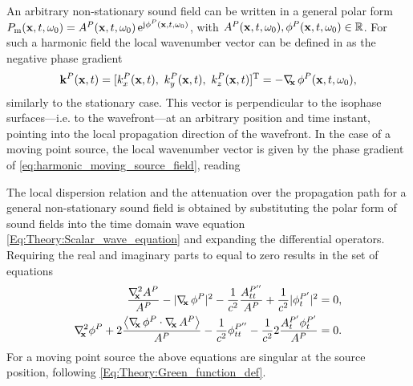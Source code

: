 An arbitrary non-stationary sound field can be written in a general polar form $P_{\mathrm{m}}(\mathbf{x},t,\omega_0) = A^P(\mathbf{x},t,\omega_0) \, \mathrm{e}^{\mathrm{j} \phi^P(\mathbf{x},t,\omega_0)}$, with $A^P(\mathbf{x},t,\omega_0),\phi^P(\mathbf{x},t,\omega_0) \in \mathbb{R}$.
For such a harmonic field the local wavenumber vector can be defined in as the negative phase gradient
\begin{equation}
\label{eq:HF_appr:general_loc_wn}
\mathbf{k}^P(\mathbf{x},t) = [k_x^P(\mathbf{x},t),\ k_y^P(\mathbf{x},t),\ k_z^P(\mathbf{x},t)]^{\mathrm{T}} = -\nabla_{\!\!\mathbf{x}}\, \phi^P(\mathbf{x},t,\omega_0),
\end{equation}
similarly to the stationary case.
This vector is perpendicular to the isophase surfaces---i.e. to the wavefront---at an arbitrary position and time instant, pointing into the local propagation direction of the wavefront.
In the case of a moving point source, the local wavenumber vector is given by the phase gradient of \eqref{eq:harmonic_moving_source_field}, reading

The local dispersion relation and the attenuation over the propagation path for a general non-stationary sound field is obtained by substituting the polar form of sound fields into the time domain wave equation \eqref{Eq:Theory:Scalar_wave_equation} and expanding the differential operators.
Requiring the real and imaginary parts to equal to zero results in the set of equations
\begin{eqnarray}
\label{eq:HF_appr:moving_eikonal}
\frac{\Lx A^P}{A^P}  - | \Dx \phi^P |^2 -\frac{1}{c^2} \frac{A^{P''}_{tt}}{A^P} +\frac{1}{c^2}|\phi^{P'}_{t}|^2 = 0, \\ 
\label{eq:HF_appr:transport_eq_non_stat}
\Lx \phi^P + 2\frac{ \left< \Dx \phi^P \cdot \Dx A^P \right> }{A^P} - \frac{1}{c^2} \phi^{P''}_{tt} - \frac{1}{c^2} 2\frac{A^{P'}_t \phi^{P'}_t }{A^P} = 0.
\end{eqnarray}
For a moving point source the above equations are singular at the source position, following \eqref{Eq:Theory:Green_function_def}.

